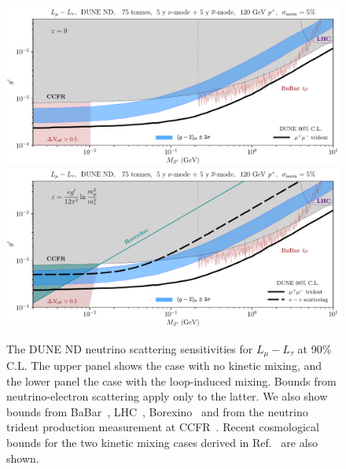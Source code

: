 \begin{figure}[t]
\centering
  \includegraphics[width=\textwidth]{lmultau_nokm.pdf}\\
 \includegraphics[width=\textwidth]{lmultau_km.pdf}
 \caption[DUNE sensitivity to a $L_\mu - L_\tau$ $Z^\prime$.]{The DUNE ND neutrino scattering sensitivities for $L_\mu - L_\tau$ at 90\% C.L. The upper panel shows the case with no kinetic mixing, and the lower panel the case with the loop-induced mixing. Bounds from neutrino-electron scattering apply only to the latter. We also show bounds from BaBar~\cite{TheBABAR:2016rlg}, LHC~\cite{Aad:2014wra}, Borexino~\cite{Kaneta:2016uyt} and from the neutrino trident production measurement at CCFR~\cite{Mishra:1991bv,Altmannshofer2014}. Recent cosmological bounds for the two kinetic mixing cases derived in Ref.~\cite{Escudero:2019gzq} are also shown. \label{fig:Lmu_Ltau}}
\end{figure}
%
%
